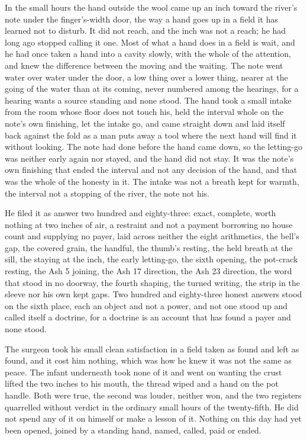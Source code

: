 In the small hours the hand outside the wool came up an inch toward the river's note under the finger's-width door, the way a hand goes up in a field it has learned not to disturb. It did not reach, and the inch was not a reach; he had long ago stopped calling it one. Most of what a hand does in a field is wait, and he had once taken a hand into a cavity slowly, with the whole of the attention, and knew the difference between the moving and the waiting. The note went water over water under the door, a low thing over a lower thing, nearer at the going of the water than at its coming, never numbered among the hearings, for a hearing wants a source standing and none stood. The hand took a small intake from the room whose floor does not touch his, held the interval whole on the note's own finishing, let the intake go, and came straight down and laid itself back against the fold as a man puts away a tool where the next hand will find it without looking. The note had done before the hand came down, so the letting-go was neither early again nor stayed, and the hand did not stay. It was the note's own finishing that ended the interval and not any decision of the hand, and that was the whole of the honesty in it. The intake was not a breath kept for warmth, the interval not a stopping of the river, the note not his.

He filed it as answer two hundred and eighty-three: exact, complete, worth nothing at two inches of air, a restraint and not a payment borrowing no house count and supplying no payer, laid across neither the eight arithmetics, the bell's gap, the covered grain, the handful, the thumb's resting, the held breath at the sill, the staying at the inch, the early letting-go, the sixth opening, the pot-crack resting, the Ash 5 joining, the Ash 17 direction, the Ash 23 direction, the word that stood in no doorway, the fourth shaping, the turned writing, the strip in the sleeve nor his own kept gaps. Two hundred and eighty-three honest answers stood on the sixth place, each an object and not a power, and not one stood up and called itself a doctrine, for a doctrine is an account that has found a payer and none stood.

The surgeon took his small clean satisfaction in a field taken as found and left as found, and it cost him nothing, which was how he knew it was not the same as peace. The infant underneath took none of it and went on wanting the crust lifted the two inches to his mouth, the thread wiped and a hand on the pot handle. Both were true, the second was louder, neither won, and the two registers quarrelled without verdict in the ordinary small hours of the twenty-fifth. He did not spend any of it on himself or make a lesson of it. Nothing on this day had yet been opened, joined by a standing hand, named, called, paid or ended.

